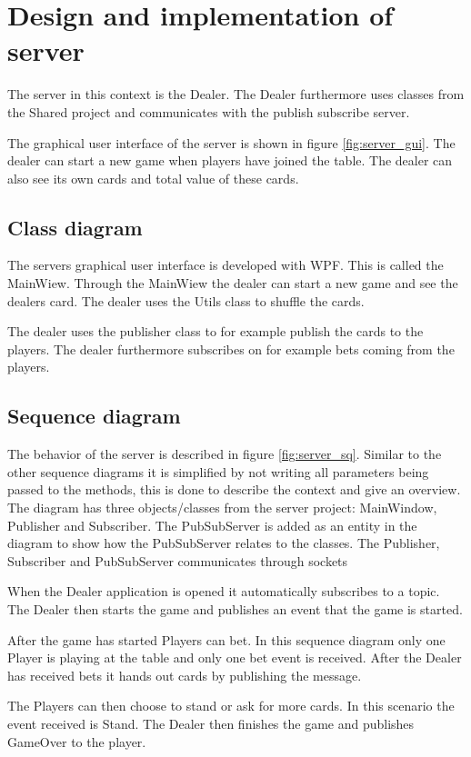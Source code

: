 \FloatBarrier

\section{Design and implementation of server}
The server in this context is the Dealer. The Dealer furthermore uses classes from the Shared project and communicates with the publish subscribe server.

The graphical user interface of the server is shown in figure \ref{fig:server_gui}. The dealer can start a new game when players have joined the table. The dealer can also see its own cards and total value of these cards.  

\FloatBarrier

\subsection{Class diagram}
The servers graphical user interface is developed with WPF. This is called the MainWiew. Through the MainWiew the dealer can start a new game and see the dealers card. The dealer uses the Utils class to shuffle the cards. 

The dealer uses the publisher class to for example publish the cards to the players. The dealer furthermore subscribes on for example bets coming from the players.

\FloatBarrier

\subsection{Sequence diagram}
The behavior of the server is described in figure \ref{fig:server_sq}. Similar to the other sequence diagrams it is simplified by not writing all parameters being passed to the methods, this is done to describe the context and give an overview. The diagram has three objects/classes from the server project: MainWindow, Publisher and Subscriber. The PubSubServer is added as an entity in the diagram to show how the PubSubServer relates to the classes. The Publisher, Subscriber and PubSubServer communicates through sockets

When the Dealer application is opened it automatically subscribes to a topic. The Dealer then starts the game and publishes an event that the game is started.

After the game has started Players can bet. In this sequence diagram only one Player is playing at the table and only one bet event is received. After the Dealer has received bets it hands out cards by publishing the message. 

The Players can then choose to stand or ask for more cards. In this scenario the event received is Stand. The Dealer then finishes the game and publishes GameOver to the player.

\FloatBarrier
